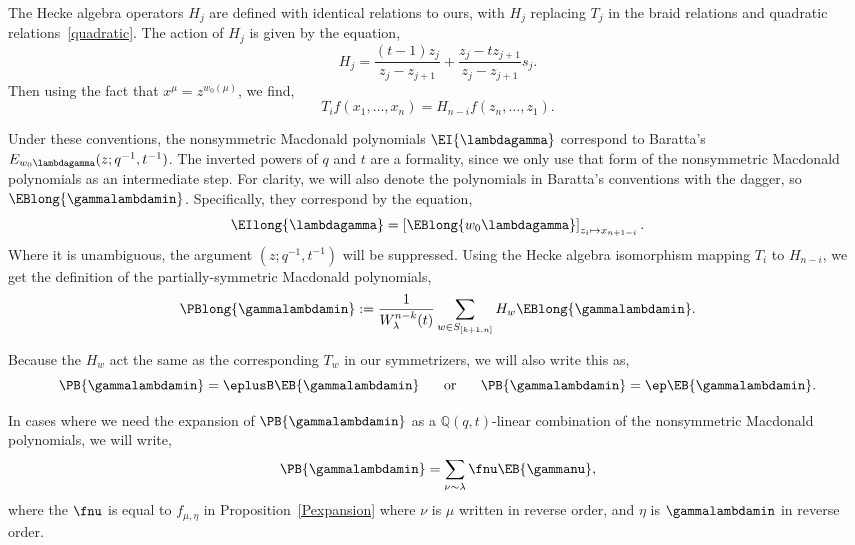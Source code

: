 The Hecke algebra operators $H_j$ are defined with identical relations to ours, with $H_j$ replacing $T_j$ in the braid relations and quadratic relations~\eqref{quadratic}. The action of $H_j$ is given by the equation,
\[ H_j = \frac{(t-1)z_j}{z_j-z_{j+1}} + \frac{z_j-tz_{j+1}}{z_j-z_{j+1}} s_j. \label{DLbaratta}\]
Then using the fact that $x^\mu = z^{w_0(\mu)}$, we find,
\[ T_i f(x_1, \dotsc, x_n) = H_{n-i}f(z_n, \dotsc, z_1).\]


Under these conventions, the nonsymmetric Macdonald polynomials $\EI{\lambdagamma}$ correspond to Baratta's $E_{w_0 \lambdagamma}(z;q^{-1},t^{-1})$. The inverted powers of $q$ and $t$ are a formality, since we only use that form of the nonsymmetric Macdonald polynomials as an intermediate step. For clarity, we will also denote the polynomials in Baratta's conventions with the dagger, so $\EBlong{\gammalambdamin}$. Specifically, they correspond by the equation,
\[ \EIlong{\lambdagamma}=\left[\EBlong{w_0\lambdagamma}\right]_{z_i \mapsto x_{n+1-i}}. \]
Where it is unambiguous, the argument $(z;q^{-1},t^{-1})$ will be suppressed. Using the Hecke algebra isomorphism mapping $T_i$ to $H_{n-i}$, we get the definition of the partially-symmetric Macdonald polynomials,
\[\PBlong{\gammalambdamin} := \frac{1}{W^{n-k}_{\lambda}(t)} \sum_{w\in S_{[k+1, n]}} H_w \EBlong{\gammalambdamin}.\]

Because the $H_w$ act the same as the corresponding $T_w$ in our symmetrizers, we will also write this as,
\[ \PB{\gammalambdamin} = \eplusB  \EB{\gammalambdamin} \hspace*{.5cm} \text{ or } \hspace*{.5cm} \PB{\gammalambdamin} = \ep \EB{\gammalambdamin}. \]

In cases where we need the expansion of $\PB{\gammalambdamin}$ as a $\mathbb{Q}(q,t)$-linear combination of the nonsymmetric Macdonald polynomials, we will write,
\[ \PB{\gammalambdamin}=\sum_{\nu \sim \lambda} \fnu \EB{\gammanu},\]
where the $\fnu$ is equal to $f_{\mu, \eta}$ in Proposition~\ref{Pexpansion} where $\nu$ is $\mu$ written in reverse order, and $\eta$ is $\gammalambdamin$ in reverse order.
